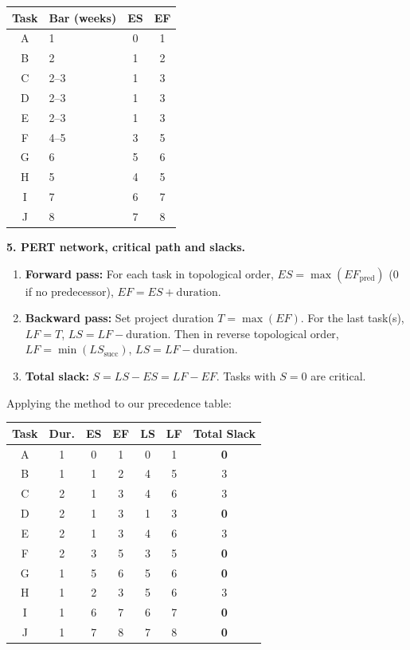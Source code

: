 \documentclass[11pt]{article}
\begin{document}
\begin{center}
\begin{tabularx}{\linewidth}{|c|X|c|c|}
\hline
\rowcolor{popblueL} \textbf{Task} & \textbf{Bar (weeks)} & \textbf{ES} & \textbf{EF} \\
\hline
A & 1 & 0 & 1 \\
B & 2 & 1 & 2 \\
C & 2--3 & 1 & 3 \\
D & 2--3 & 1 & 3 \\
E & 2--3 & 1 & 3 \\
F & 4--5 & 3 & 5 \\
G & 6 & 5 & 6 \\
H & 5 & 4 & 5 \\
I & 7 & 6 & 7 \\
J & 8 & 7 & 8 \\
\hline
\end{tabularx}
\end{center}

\textbf{5. PERT network, critical path and slacks.}

\begin{methode}
\begin{enumerate}
\item \textbf{Forward pass:} For each task in topological order, $ES = \max(EF_{\text{pred}})$ (0 if no predecessor), $EF = ES + \text{duration}$.
\item \textbf{Backward pass:} Set project duration $T = \max(EF)$. For the last task(s), $LF = T$, $LS = LF - \text{duration}$. Then in reverse topological order, $LF = \min(LS_{\text{succ}})$, $LS = LF - \text{duration}$.
\item \textbf{Total slack:} $S = LS - ES = LF - EF$. Tasks with $S=0$ are critical.
\end{enumerate}
\end{methode}

Applying the method to our precedence table:

\begin{center}
\begin{tabular}{|c|c|c|c|c|c|c|}
\hline
\rowcolor{popblueL} \textbf{Task} & \textbf{Dur.} & \textbf{ES} & \textbf{EF} & \textbf{LS} & \textbf{LF} & \textbf{Total Slack} \\
\hline
A & 1 & 0 & 1 & 0 & 1 & \textbf{0} \\
B & 1 & 1 & 2 & 4 & 5 & 3 \\
C & 2 & 1 & 3 & 4 & 6 & 3 \\
D & 2 & 1 & 3 & 1 & 3 & \textbf{0} \\
E & 2 & 1 & 3 & 4 & 6 & 3 \\
F & 2 & 3 & 5 & 3 & 5 & \textbf{0} \\
G & 1 & 5 & 6 & 5 & 6 & \textbf{0} \\
H & 1 & 2 & 3 & 5 & 6 & 3 \\
I & 1 & 6 & 7 & 6 & 7 & \textbf{0} \\
J & 1 & 7 & 8 & 7 & 8 & \textbf{0} \\
\hline
\end{tabular}
\end{center}
\end{document}
